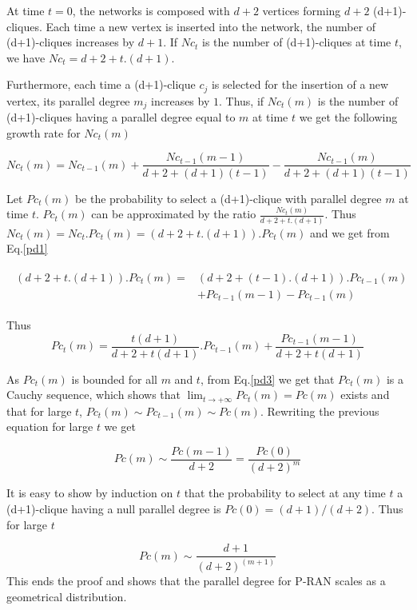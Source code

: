 \documentclass[11pt]{iopart}
\newenvironment{proof}[1][Proof]{\begin{trivlist}
    \item[\hskip \labelsep {\bfseries #1}]}{\end{trivlist}}
\newcommand{\qed}{\nobreak \ifvmode \relax \else
          \ifdim\lastskip<1.5em \hskip-\lastskip
          \hskip1.5em plus0em minus0.5em \fi \nobreak
          \vrule height0.75em width0.5em depth0.25em\fi}
\begin{document}
\begin{proof}
At time $t=0$, the networks is composed with $d+2$ vertices forming $d+2$ (d+1)-cliques. Each time a new vertex is inserted into the network, the number of (d+1)-cliques increases by $d+1$. If $Nc_t$ is the number of (d+1)-cliques at time $t$, we have $Nc_t = d+2+t.(d+1)$.

Furthermore, each time a (d+1)-clique $c_j$ is selected for the insertion of a new vertex, its parallel degree $m_j$ increases by $1$. Thus, if $Nc_t(m)$ is the number of (d+1)-cliques having a parallel degree equal to $m$ at time $t$ we get the following growth rate for $Nc_t(m)$
 
\begin{equation}
\label{pd1}
 Nc_t(m) = Nc_{t-1}(m)+\frac{Nc_{t-1}(m-1)}{d+2 +(d+1)(t-1)}-\frac{Nc_{t-1}(m)}{d+2 +(d+1)(t-1)}
\end{equation} 

Let $Pc_t(m)$ be the probability to select a (d+1)-clique with parallel degree $m$ at time $t$. $Pc_t(m)$ can be approximated by the ratio $\frac{Nc_t(m)}{d+2+t.(d+1)}$. Thus $Nc_t(m)=Nc_t.Pc_t(m)=(d+2+t.(d+1)).Pc_t(m)$ and we get from Eq.\ref{pd1}

\begin{eqnarray}
\label{pd2}
 \begin{array}{ll}
 (d+2+t.(d+1)).Pc_t(m)=&(d+2+(t-1).(d+1)).Pc_{t-1}(m)\\
 											 &+Pc_{t-1}(m-1)-Pc_{t-1}(m)
 \end{array}
\end{eqnarray} 

Thus
\begin{equation}
\label{pd3}
 Pc_t(m)=\frac{t(d+1)}{d+2+t(d+1)}.Pc_{t-1}(m)+\frac{Pc_{t-1}(m-1)}{d+2+t(d+1)}
\end{equation}

As $Pc_t(m)$ is bounded for all $m$ and $t$, from Eq.\ref{pd3} we get that $Pc_t(m)$ is a Cauchy sequence, which shows that $\lim_{t \to +\infty}Pc_t(m)=Pc(m)$ exists and that for large $t$, $Pc_t(m) \sim Pc_{t-1}(m) \sim Pc(m)$. Rewriting the previous equation for large $t$ we get

\begin{equation}
\label{pd4}
 Pc(m)\sim \frac{Pc(m-1)}{d+2} = \frac{Pc(0)}{(d+2)^m}
\end{equation} 

It is easy to show by induction on $t$ that the probability to select at any time $t$ a (d+1)-clique having a null parallel degree is $Pc(0)=(d+1)/(d+2)$. Thus for large $t$

\begin{equation}
\label{pd5}
 Pc(m) \sim \frac{d+1}{(d+2)^{(m+1)}}
\end{equation}
This ends the proof and shows that the parallel degree for P-RAN scales as a geometrical distribution.
\qed
\end{proof}
\end{document}
